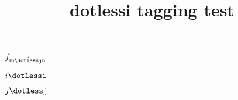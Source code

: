 \documentclass{article}
\title{dotlessi tagging test}
\begin{document}
$f_{\mathrm{m\acute{\dotlessj}n}}$

\dotlessi $i\dotlessi$

\dotlessj $j\dotlessj$
\end{document}
